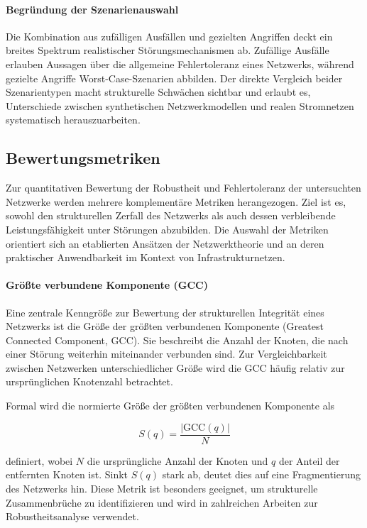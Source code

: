 \documentclass[14pt,a4paper]{scrartcl}
\begin{document}
\paragraph{Begründung der Szenarienauswahl}
Die Kombination aus zufälligen Ausfällen und gezielten Angriffen deckt ein
breites Spektrum realistischer Störungsmechanismen ab. Zufällige Ausfälle
erlauben Aussagen über die allgemeine Fehlertoleranz eines Netzwerks, während
gezielte Angriffe Worst-Case-Szenarien abbilden. Der direkte Vergleich beider
Szenarientypen macht strukturelle Schwächen sichtbar und erlaubt es,
Unterschiede zwischen synthetischen Netzwerkmodellen und realen Stromnetzen
systematisch herauszuarbeiten.


\subsection{Bewertungsmetriken}

Zur quantitativen Bewertung der Robustheit und Fehlertoleranz der
untersuchten Netzwerke werden mehrere komplementäre Metriken herangezogen.
Ziel ist es, sowohl den strukturellen Zerfall des Netzwerks als auch dessen
verbleibende Leistungsfähigkeit unter Störungen abzubilden. Die Auswahl der
Metriken orientiert sich an etablierten Ansätzen der Netzwerktheorie und an
deren praktischer Anwendbarkeit im Kontext von Infrastrukturnetzen.

\paragraph{Größte verbundene Komponente (GCC)}
Eine zentrale Kenngröße zur Bewertung der strukturellen Integrität eines
Netzwerks ist die Größe der größten verbundenen Komponente (Greatest Connected
Component, GCC). Sie beschreibt die Anzahl der Knoten, die nach einer Störung
weiterhin miteinander verbunden sind. Zur Vergleichbarkeit zwischen Netzwerken
unterschiedlicher Größe wird die GCC häufig relativ zur ursprünglichen
Knotenzahl betrachtet.

Formal wird die normierte Größe der größten verbundenen Komponente als


\[
S(q) = \frac{|\text{GCC}(q)|}{N}
\]


definiert, wobei $N$ die ursprüngliche Anzahl der Knoten und $q$ der Anteil der
entfernten Knoten ist. Sinkt $S(q)$ stark ab, deutet dies auf eine
Fragmentierung des Netzwerks hin. Diese Metrik ist besonders geeignet, um
strukturelle Zusammenbrüche zu identifizieren und wird in zahlreichen Arbeiten
zur Robustheitsanalyse verwendet.
\end{document}
